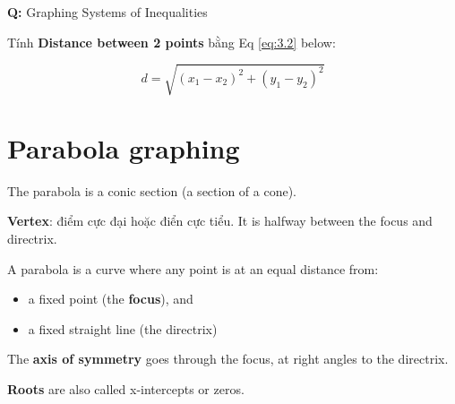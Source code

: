 \textbf{Q: }Graphing Systems of Inequalities

\vspace{5mm}

Tính \textbf{Distance between 2 points} bằng Eq \ref{eq:3.2} below:

\begin{equation}
  d = \sqrt{(x_{1}-x_{2})^{2} + (y_{1}-y_{2})^{2}}
  \label{eq:3.2}
\end{equation}

\vspace{5mm}

\section{Parabola graphing}

The parabola is a conic section (a section of a cone).

\textbf{Vertex}: điểm cực đại hoặc điển cực tiểu. It is halfway between the focus and directrix.

A parabola is a curve where any point is at an equal distance from:
\begin{itemize}
	\item a fixed point (the \textbf{focus}), and
    \item a fixed straight line (the directrix)
\end{itemize}

The \textbf{axis of symmetry} goes through the focus, at right angles to the directrix.

\textbf{Roots} are also called x-intercepts or zeros.

